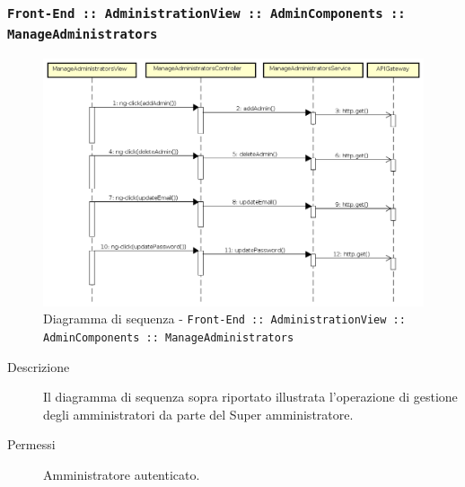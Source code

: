 \documentclass[../DefinizioneDiProdotto_v2.0.0.tex]{subfiles}
\begin{document}
\newpage
\subsubsection{\texttt{Front-End :: AdministrationView :: AdminComponents :: ManageAdministrators}}
\begin{figure}[!h]
	\centering
	\includegraphics[scale=0.3]{DiagrammiSequenza/Front-End/AdministrationView/ManageAdministrators.png}
	\caption{Diagramma di sequenza - \texttt{Front-End :: AdministrationView :: AdminComponents :: ManageAdministrators }}
\end{figure}
\begin{description}
	\item [Descrizione] Il diagramma di sequenza sopra riportato illustrata l'operazione di gestione degli amministratori da parte del Super amministratore.
	\item [Permessi] Amministratore autenticato.
\end{description}

\newpage
\end{document}
